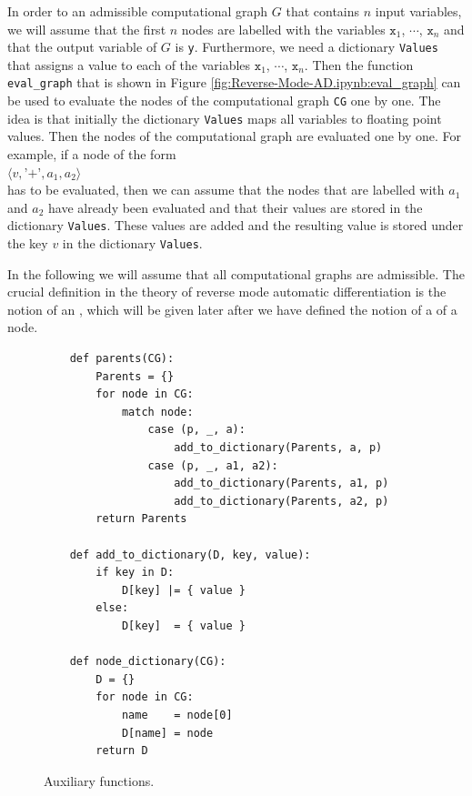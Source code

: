 In order to  an admissible computational graph $G$ that contains $n$ input variables, we will
assume that the first $n$ nodes are labelled with the variables $\mathtt{x}_1$, $\cdots$, $\mathtt{x}_n$ and
that the output variable of $G$ is \texttt{y}.  Furthermore, we need a dictionary \texttt{Values} that
assigns a value to each 
of the variables $\mathtt{x}_1$, $\cdots$, $\mathtt{x}_n$.  Then the function \texttt{eval\_graph} that is shown in Figure
\ref{fig:Reverse-Mode-AD.ipynb:eval_graph} can be used to evaluate the nodes of the computational graph
\texttt{CG} one by one.  The idea is that initially the dictionary \texttt{Values} maps all variables to
floating point values.  Then the nodes of the computational graph are evaluated one by one.  For example, if a
node of the form
\\[0.2cm]
\hspace*{1.3cm}
$\langle v, \texttt{'+'}, a_1, a_2 \rangle$
\\[0.2cm]
has to be evaluated, then we can assume that the nodes that are labelled with $a_1$ and $a_2$ have already been
evaluated and that their values are stored in the dictionary \texttt{Values}.  These values are added and the
resulting value is stored under the key $v$ in the dictionary \texttt{Values}.

In the following we will assume that all computational graphs are admissible.
The crucial definition in the theory of reverse mode automatic differentiation is the notion of an
, which will be given later after we have defined the notion of a  of a node.  
\FloatBarrier

\begin{figure}[!ht]
\centering
\begin{verbatim}
    def parents(CG):
        Parents = {}
        for node in CG:
            match node:
                case (p, _, a):
                    add_to_dictionary(Parents, a, p)
                case (p, _, a1, a2):
                    add_to_dictionary(Parents, a1, p)
                    add_to_dictionary(Parents, a2, p)
        return Parents                 
    
    def add_to_dictionary(D, key, value):
        if key in D:
            D[key] |= { value }
        else:
            D[key]  = { value }
    
    def node_dictionary(CG):
        D = {}
        for node in CG:
            name    = node[0]
            D[name] = node
        return D
\end{verbatim}
\vspace*{-0.3cm}
\caption{Auxiliary functions.}
\label{fig:Reverse-Mode-AD.ipynb:auxiliary}
\end{figure}

